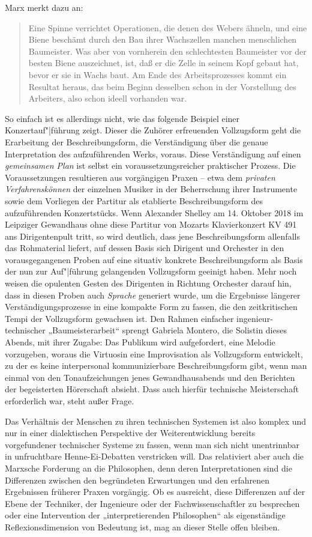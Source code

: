 \documentclass[11pt,a4paper]{article}
\begin{document}
Marx \cite[S. 193]{MEW23} merkt dazu an:
\begin{quote}
  Eine Spinne verrichtet Operationen, die denen des Webers ähneln, und eine
  Biene beschämt durch den Bau ihrer Wachszellen manchen menschlichen
  Baumeister. Was aber von vornherein den schlechtesten Baumeister vor der
  besten Biene auszeichnet, ist, daß er die Zelle in seinem Kopf gebaut hat,
  bevor er sie in Wachs baut. Am Ende des Arbeitsprozesses kommt ein Resultat
  heraus, das beim Beginn desselben schon in der Vorstellung des Arbeiters,
  also schon ideell vorhanden war.
\end{quote}
So einfach ist es allerdings nicht, wie das folgende Beispiel einer
Konzertauf"|führung zeigt. Dieser die Zuhörer erfreuenden Vollzugsform geht
die Erarbeitung der Beschreibungsform, die Verständigung über die genaue
Interpretation des aufzuführenden Werks, voraus. Diese Verständigung auf einen
\emph{gemeinsamen Plan} ist selbst ein voraussetzungsreicher praktischer
Prozess.  Die Voraussetzungen resultieren aus vorgängigen Praxen -- etwa dem
\emph{privaten Verfahrenskönnen} der einzelnen Musiker in der Beherrschung
ihrer Instrumente sowie dem Vorliegen der Partitur als etablierte
Beschreibungsform des aufzuführenden Konzertstücks.  Wenn Alexander Shelley am
14. Oktober 2018 im Leipziger Gewandhaus ohne diese Partitur von Mozarts
Klavierkonzert KV 491 ans Dirigentenpult tritt, so wird deutlich, dass jene
Beschreibungsform allenfalls das Rohmaterial liefert, auf dessen Basis sich
Dirigent und Orchester in den vorausgegangenen Proben auf eine situativ
konkrete Beschreibungsform als Basis der nun zur Auf"|führung gelangenden
Vollzugsform geeinigt haben. Mehr noch weisen die opulenten Gesten des
Dirigenten in Richtung Orchester darauf hin, dass in diesen Proben auch
\emph{Sprache} generiert wurde, um die Ergebnisse längerer
Verständigungsprozesse in eine kompakte Form zu fassen, die den zeitkritischen
Tempi der Vollzugsform gewachsen ist.  Den Rahmen einfacher
ingenieur-technischer „Baumeisterarbeit“ sprengt Gabriela Montero, die
Solistin dieses Abends, mit ihrer Zugabe: Das Publikum wird aufgefordert, eine
Melodie vorzugeben, woraus die Virtuosin eine Improvisation als Vollzugsform
entwickelt, zu der es keine interpersonal kommunizierbare Beschreibungsform
gibt, wenn man einmal von den Tonaufzeichungen jenes Gewandhausabends und den
Berichten der begeisterten Hörerschaft absieht.  Dass auch hierfür technische
Meisterschaft erforderlich war, steht außer Frage.

Das Verhältnis der Menschen zu ihren technischen Systemen ist also komplex und
nur in einer dialektischen Perspektive der Weiterentwicklung bereits
vorgefundener technischer Systeme zu fassen, wenn man sich nicht unentrinnbar
in unfruchtbare Henne-Ei-Debatten verstricken will.  Das relativiert aber auch
die Marxsche Forderung an die Philosophen, denn deren Interpretationen sind
die Differenzen zwischen den begründeten Erwartungen und den erfahrenen
Ergebnissen früherer Praxen vorgängig. Ob es ausreicht, diese Differenzen auf
der Ebene der Techniker, der Ingenieure oder der Fachwissenschaftler zu
besprechen oder eine Intervention der „interpretierenden Philosophen“ als
eigenständige Reflexionsdimension von Bedeutung ist, mag an dieser Stelle
offen bleiben. 
\end{document}
